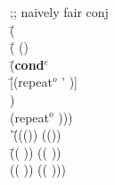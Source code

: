     \begin{ZZZZschemedisplay}%
;; naively fair conj\\%
\va{$\gt$} \=(  \\%
  \>\PRN \HL \=( ()\\%
  \>  \>\PRN \HL \=(\textbf{cond$^e$}\\%
  \>  \>  \>\PRN \HL \=[(repeat$^o$ ' )]\\%
  \>  \>  \>  \>[(repeat$^o$ '\cn{b} \va{xs})])\\%
  \>  \>  \>(repeat$^o$  )))\\%
'\=((()) (())\\%
 \>\PRN \=(( )) (( ))\\%
 \> \>((  )) ((  )))
\end{ZZZZschemedisplay}
	